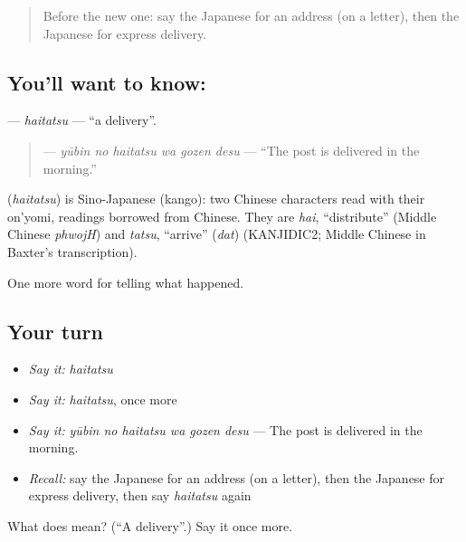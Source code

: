 \begin{quote}
Before the new one: say the Japanese for an address (on a letter), then the Japanese for express delivery.
\end{quote}

\subsection*{You'll want to know: }
\textbf{} — \emph{haitatsu} — \textquotedblleft{}a delivery\textquotedblright{}.

\begin{quote}
\textbf{  } — \emph{yūbin no haitatsu wa gozen desu} — \textquotedblleft{}The post is delivered in the morning.\textquotedblright{}
\end{quote}

\begin{cousinweb}
\textbf{} (\emph{haitatsu}) is Sino-Japanese (kango): two Chinese characters read with their on'yomi, readings borrowed from Chinese. They are \emph{hai}, \textquotedblleft{}distribute\textquotedblright{} (Middle Chinese \emph{phwojH}) and \emph{tatsu}, \textquotedblleft{}arrive\textquotedblright{} (\emph{dat}) (KANJIDIC2; Middle Chinese in Baxter's transcription).
\end{cousinweb}

\begin{grammarlens}[title={What you've built}]
One more word for telling what happened.
\end{grammarlens}

\subsection*{Your turn}
\begin{itemize}
\raggedright
  \item \emph{Say it:} \emph{haitatsu}
  \item \emph{Say it:} \emph{haitatsu}, once more
  \item \emph{Say it:} \emph{yūbin no haitatsu wa gozen desu} — The post is delivered in the morning.
  \item \emph{Recall:} say the Japanese for an address (on a letter), then the Japanese for express delivery, then say \emph{haitatsu} again
\end{itemize}

\begin{tcolorbox}[breakable,colback=teal!4,colframe=teal!35!black,title={Before you move on}]
What does  mean? (\textquotedblleft{}A delivery\textquotedblright{}.) Say it once more.
\end{tcolorbox}
